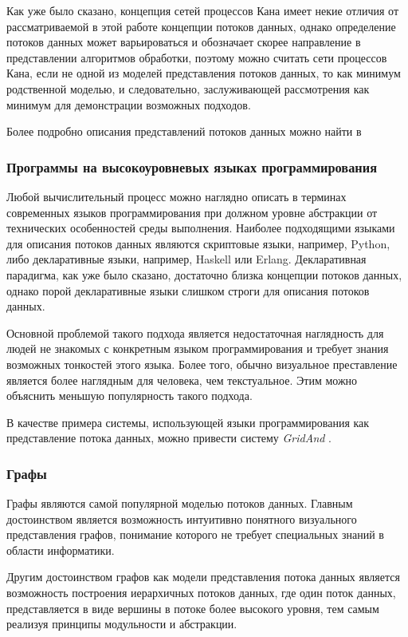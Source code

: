 \documentclass[10pt,a4paper]{article}
\begin{document}
Как уже было сказано, концепция сетей процессов Кана имеет некие отличия от рассматриваемой в этой работе концепции потоков данных,
однако определение потоков данных может варьироваться и обозначает скорее направление в представлении алгоритмов обработки,
поэтому можно считать сети процессов Кана, если не одной из моделей представления потоков данных, то как минимум родственной моделью,
и следовательно, заслуживающей рассмотрения как минимум для демонстрации возможных подходов.

Более подробно описания представлений потоков данных можно найти в \cite{sci-wf-systems}

\subsubsection{Программы на высокоуровневых языках программирования}
Любой вычислительный процесс можно наглядно описать в терминах современных языков программирования при должном уровне абстракции от технических особенностей среды выполнения.
Наиболее подходящими языками для описания потоков данных являются скриптовые языки, например, Python, либо декларативные языки, например, Haskell или Erlang.
Декларативная парадигма, как уже было сказано, достаточно близка концепции потоков данных, однако порой декларативные языки слишком строги для описания потоков данных.

Основной проблемой такого подхода является недостаточная наглядность для людей не знакомых с конкретным языком программирования и требует знания возможных тонкостей этого языка.
Более того, обычно визуальное преставление является более наглядным для человека, чем текстуальное. Этим можно объяснить меньшую популярность такого подхода.

В качестве примера системы, использующей языки программирования как представление потока данных, можно привести систему \textit{GridAnd} \cite{grid-ant}.

\subsubsection{Графы}
Графы являются самой популярной моделью потоков данных.
Главным достоинством является возможность интуитивно понятного визуального представления графов, понимание которого не требует специальных знаний в области информатики.

Другим достоинством графов как модели представления потока данных является возможность построения иерархичных потоков данных, где один поток данных,
представляется в виде вершины в потоке более высокого уровня, тем самым реализуя принципы модульности и абстракции.
\end{document}
